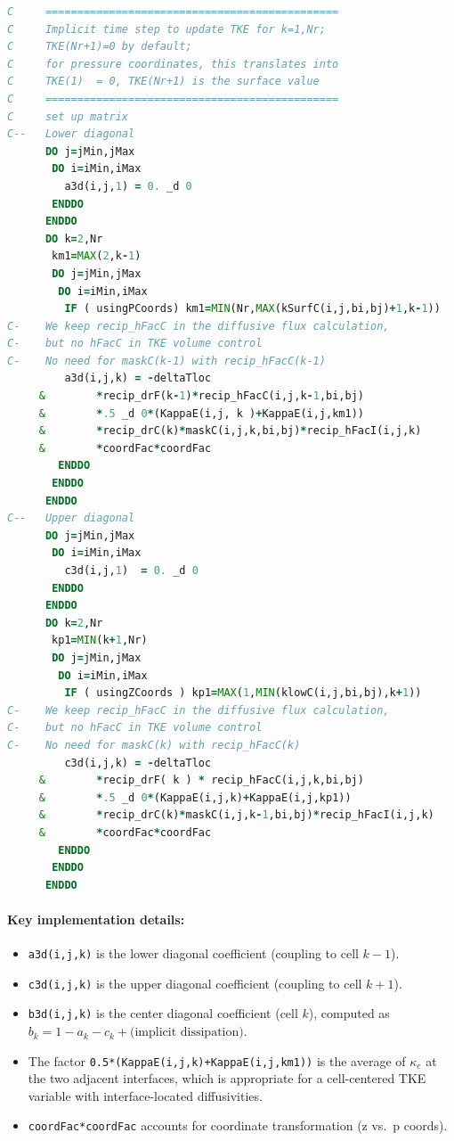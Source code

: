 \documentclass[12pt,letterpaper]{article}
\begin{document}
\begin{lstlisting}[language=Fortran,caption={(ggl90\_calc.F:L668--720) Tridiagonal matrix setup for implicit TKE diffusion}]
C     ==============================================
C     Implicit time step to update TKE for k=1,Nr;
C     TKE(Nr+1)=0 by default;
C     for pressure coordinates, this translates into
C     TKE(1)  = 0, TKE(Nr+1) is the surface value
C     ==============================================
C     set up matrix
C--   Lower diagonal
      DO j=jMin,jMax
       DO i=iMin,iMax
         a3d(i,j,1) = 0. _d 0
       ENDDO
      ENDDO
      DO k=2,Nr
       km1=MAX(2,k-1)
       DO j=jMin,jMax
        DO i=iMin,iMax
         IF ( usingPCoords) km1=MIN(Nr,MAX(kSurfC(i,j,bi,bj)+1,k-1))
C-    We keep recip_hFacC in the diffusive flux calculation,
C-    but no hFacC in TKE volume control
C-    No need for maskC(k-1) with recip_hFacC(k-1)
         a3d(i,j,k) = -deltaTloc
     &        *recip_drF(k-1)*recip_hFacC(i,j,k-1,bi,bj)
     &        *.5 _d 0*(KappaE(i,j, k )+KappaE(i,j,km1))
     &        *recip_drC(k)*maskC(i,j,k,bi,bj)*recip_hFacI(i,j,k)
     &        *coordFac*coordFac
        ENDDO
       ENDDO
      ENDDO
C--   Upper diagonal
      DO j=jMin,jMax
       DO i=iMin,iMax
         c3d(i,j,1)  = 0. _d 0
       ENDDO
      ENDDO
      DO k=2,Nr
       kp1=MIN(k+1,Nr)
       DO j=jMin,jMax
        DO i=iMin,iMax
         IF ( usingZCoords ) kp1=MAX(1,MIN(klowC(i,j,bi,bj),k+1))
C-    We keep recip_hFacC in the diffusive flux calculation,
C-    but no hFacC in TKE volume control
C-    No need for maskC(k) with recip_hFacC(k)
         c3d(i,j,k) = -deltaTloc
     &        *recip_drF( k ) * recip_hFacC(i,j,k,bi,bj)
     &        *.5 _d 0*(KappaE(i,j,k)+KappaE(i,j,kp1))
     &        *recip_drC(k)*maskC(i,j,k-1,bi,bj)*recip_hFacI(i,j,k)
     &        *coordFac*coordFac
        ENDDO
       ENDDO
      ENDDO
\end{lstlisting}

\paragraph{Key implementation details:}
\begin{itemize}
\item \verb|a3d(i,j,k)| is the lower diagonal coefficient (coupling to cell $k-1$).
\item \verb|c3d(i,j,k)| is the upper diagonal coefficient (coupling to cell $k+1$).
\item \verb|b3d(i,j,k)| is the center diagonal coefficient (cell $k$), computed as $b_k = 1 - a_k - c_k + \text{(implicit dissipation)}$.
\item The factor \verb|0.5*(KappaE(i,j,k)+KappaE(i,j,km1))| is the average of $\kappa_e$ at the two adjacent interfaces, which is appropriate for a cell-centered TKE variable with interface-located diffusivities.
\item \verb|coordFac*coordFac| accounts for coordinate transformation (z vs.\ p coords).
\end{itemize}
\end{document}
